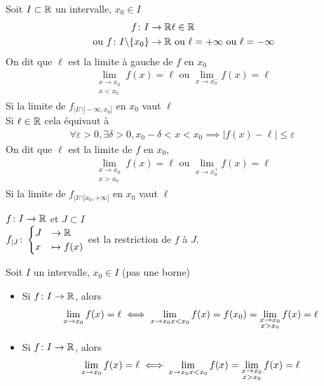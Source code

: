 \begin{graybox}
\begin{definition}
Soit $I \subset \mathbb{R}$ un intervalle, $x_0 \in I$
\begin{align*}
f \colon I \to \mathbb{R} & \ell \in \mathbb{R} \\
\text{ ou } f \colon I\backslash\{x_0\} \to \mathbb{R} & \text{ ou } \ell = +\infty \text{ ou } \ell = -\infty
\end{align*}
On dit que $\ell$ est la limite à gauche de $f$ en $x_0$ 
\begin{align*}
\lim_{\substack{x \to x_0 \\  x < x_0}} f(x) = \ell \text{ ou } \lim_{x \to x_0^-} f(x) = \ell
\end{align*}
Si la limite de $f_{\mid I \cap ]-\infty, x_0]}$  en $x_0$ vaut $\ell$\\
Si $\ell \in \mathbb{R}$ cela équivaut à 
\begin{align*}
\forall \varepsilon > 0, \exists \delta > 0, x_0 - \delta < x < x_0 \implies |f(x) - \ell| \leq \varepsilon
\end{align*}
On dit que $\ell$ est la limite de $f$ en $x_0$,
\begin{align*}
\lim_{\substack{x \to x_0 \\ x > x_0}} f(x) = \ell \text{ ou } \lim_{x \to x_0^+} f(x) = \ell
\end{align*}
Si la limite de $f_{\mid I \cap ]x_0, +\infty]}$ en $x_0$ vaut $\ell$
\end{definition}
\end{graybox}

\begin{remarque}
$f \colon I \to \mathbb{R}$ et $J \subset I$ 
\\
$f_{\mid J} \colon 
\begin{cases}
J &\to \mathbb{R} \\
x &\mapsto f(x)
\end{cases}
$
est la restriction de $f$ à $J$.
\end{remarque}

\par \noindent Soit $I$ un intervalle, $x_0 \in I$ (pas une borne)
\begin{itemize}
\item Si $f \colon I \to \mathbb{R}$, alors 
\begin{align*}
\lim_{x \to x_0} f(x) = \ell \iff \lim_{x \to x_0 \newline x < x_0} f(x) = f(x_0) = \lim_{\substack{x \to x_0 \\ x > x_0}} f(x) = \ell
\end{align*}
\item Si $f \colon I \to \mathbb{R}$, alors 
\begin{align*}
\lim_{x \to x_0} f(x) = \ell \iff \lim_{x \to x_0 \newline x < x_0} f(x) = \lim_{\substack{x \to x_0 \\ x > x_0}} f(x) = \ell
\end{align*}
\end{itemize}


